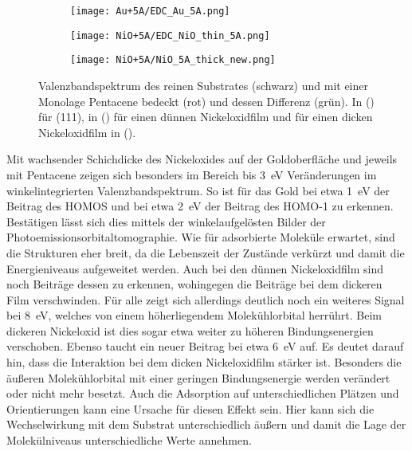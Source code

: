         \begin{figure}
            \centering
            \begin{subfigure}[t]{0.30\textwidth}
                \centering
                \texttt{[image: Au+5A/EDC\_Au\_5A.png]}
                \subcaption{}
                \label{fig:EDC_Au+5A}
            \end{subfigure}
            \begin{subfigure}[t]{0.30\textwidth}
                \centering
                \texttt{[image: NiO+5A/EDC\_NiO\_thin\_5A.png]}
                \subcaption{}
                \label{fig:EDC_NiO_thin+5A}
            \end{subfigure}
            \begin{subfigure}[t]{0.30\textwidth}
                \centering
                \texttt{[image: NiO+5A/NiO\_5A\_thick\_new.png]}
                \subcaption{}
                \label{fig:EDC_NiO+5A}
            \end{subfigure}
            \caption{Valenzbandspektrum des reinen Substrates (schwarz) und mit einer Monolage Pentacene bedeckt (rot) und dessen Differenz (grün).
            In () für (111), in () für einen dünnen Nickeloxidfilm und für einen dicken Nickeloxidfilm in ().}
        \end{figure}
        Mit wachsender Schichdicke des Nickeloxides auf der Goldoberfläche und jeweils mit Pentacene zeigen sich besonders im Bereich bis \SI{3}{\electronvolt} Veränderungen im winkelintegrierten Valenzbandspektrum.
        So ist für das Gold bei etwa \SI{1}{\electronvolt} der Beitrag des HOMOS und bei etwa \SI{2}{\electronvolt} der Beitrag des HOMO-1 zu erkennen.
        Bestätigen lässt sich dies mittels der winkelaufgelösten Bilder der Photoemissionsorbitaltomographie.
        Wie für adsorbierte Moleküle erwartet, sind die Strukturen eher breit, da die Lebenszeit der Zustände verkürzt und damit die Energieniveaus aufgeweitet werden.
        Auch bei den dünnen Nickeloxidfilm sind noch Beiträge dessen zu erkennen, wohingegen die Beiträge bei dem dickeren Film verschwinden.
        Für alle zeigt sich allerdings deutlich noch ein weiteres Signal bei \SI{8}{\electronvolt}, welches von einem höherliegendem Molekühlorbital herrührt.
        Beim dickeren Nickeloxid ist dies sogar etwa weiter zu höheren Bindungsenergien verschoben.
        Ebenso taucht ein neuer Beitrag bei etwa \SI{6}{\electronvolt} auf.
        Es deutet darauf hin, dass die Interaktion bei dem dicken Nickeloxidfilm stärker ist.
        Besonders die äußeren Molekühlorbital mit einer geringen Bindungsenergie werden verändert oder nicht mehr besetzt.
        Auch die Adsorption auf unterschiedlichen Plätzen und Orientierungen kann eine Ursache für diesen Effekt sein.
        Hier kann sich die Wechselwirkung mit dem Substrat unterschiedlich äußern und damit die Lage der Molekülniveaus unterschiedliche Werte annehmen.

